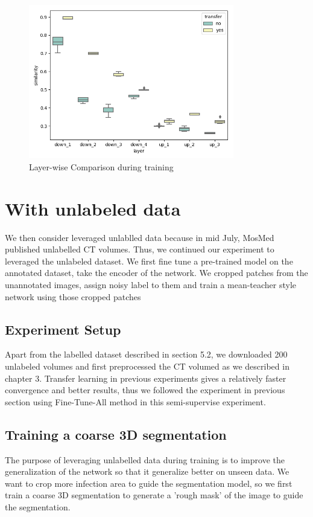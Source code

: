 \begin{figure}
	\centering
	\includegraphics[width=0.8\textwidth]{img/SVCCA/sim_trans_withwithout.png}
	\caption{Layer-wise Comparison during training}
	\label{fig:layer-wise-comparison}
\end{figure}


\section{With unlabeled data}
We then consider leveraged unlablled data because in mid July, MosMed published unlabelled CT volumes. Thus, we continued our experiment to leveraged the unlabeled dataset. 
 We first fine tune a pre-trained model on the annotated dataset, take the encoder of the network. We cropped patches from the unannotated images, assign noisy label to them and train a mean-teacher style network using those cropped patches

\subsection{Experiment Setup}
Apart from the labelled dataset described in section 5.2, we downloaded 200 unlabeled volumes and first preprocessed the CT volumed as we described in chapter 3. Transfer learning in previous experiments gives a relatively faster convergence and better results, thus we followed the experiment in previous section using Fine-Tune-All method in this semi-supervise experiment.

\subsection{Training a coarse 3D segmentation}
The purpose of leveraging unlabelled data during training is to improve the generalization of the network so that it generalize better on unseen data. We want to crop more infection area to guide the segmentation model, so we first train a coarse 3D segmentation to generate a 'rough mask' of the image to guide the segmentation.


